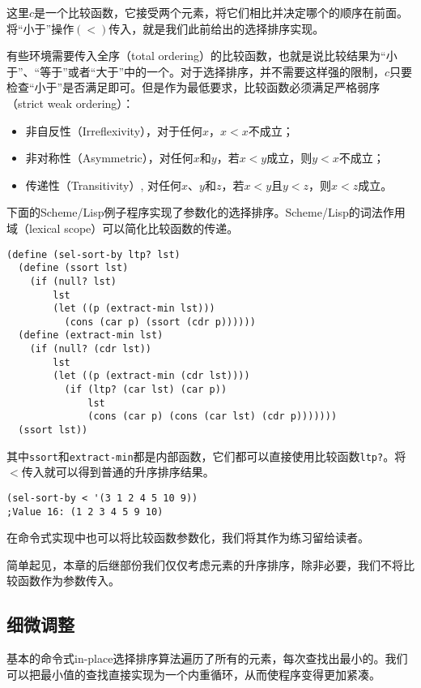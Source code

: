 \documentclass[UTF8]{article}
\begin{document}
这里$c$是一个比较函数，它接受两个元素，将它们相比并决定哪个的顺序在前面。将“小于”操作$(<)$传入，就是我们此前给出的选择排序实现。

有些环境需要传入全序（total ordering）的比较函数，也就是说比较结果为“小于”、“等于”或者“大于”中的一个。对于选择排序，并不需要这样强的限制，$c$只要检查“小于”是否满足即可。但是作为最低要求，比较函数必须满足严格弱序（strict weak ordering）\cite{wiki-sweak-order}：

\begin{itemize}
\item 非自反性（Irreflexivity），对于任何$x$，$x < x$不成立；
\item 非对称性（Asymmetric），对任何$x$和$y$，若$x < y$成立，则$y < x$不成立；
\item 传递性（Transitivity）, 对任何$x$、$y$和$z$，若$x < y$且$y < z$，则$x < z$成立。
\end{itemize}

下面的Scheme/Lisp例子程序实现了参数化的选择排序。Scheme/Lisp的词法作用域（lexical scope）可以简化比较函数的传递。

\lstset{language=Lisp}
\begin{lstlisting}
(define (sel-sort-by ltp? lst)
  (define (ssort lst)
    (if (null? lst)
        lst
        (let ((p (extract-min lst)))
          (cons (car p) (ssort (cdr p))))))
  (define (extract-min lst)
    (if (null? (cdr lst))
        lst
        (let ((p (extract-min (cdr lst))))
          (if (ltp? (car lst) (car p))
              lst
              (cons (car p) (cons (car lst) (cdr p)))))))
  (ssort lst))
\end{lstlisting}

其中\texttt{ssort}和\texttt{extract-min}都是内部函数，它们都可以直接使用比较函数\texttt{ltp?}。将$<$传入就可以得到普通的升序排序结果。

\lstset{language=Lisp}
\begin{lstlisting}
(sel-sort-by < '(3 1 2 4 5 10 9))
;Value 16: (1 2 3 4 5 9 10)
\end{lstlisting}

在命令式实现中也可以将比较函数参数化，我们将其作为练习留给读者。

简单起见，本章的后继部份我们仅仅考虑元素的升序排序，除非必要，我们不将比较函数作为参数传入。

\subsection{细微调整}

基本的命令式in-place选择排序算法遍历了所有的元素，每次查找出最小的。我们可以把最小值的查找直接实现为一个内重循环，从而使程序变得更加紧凑。
\end{document}
